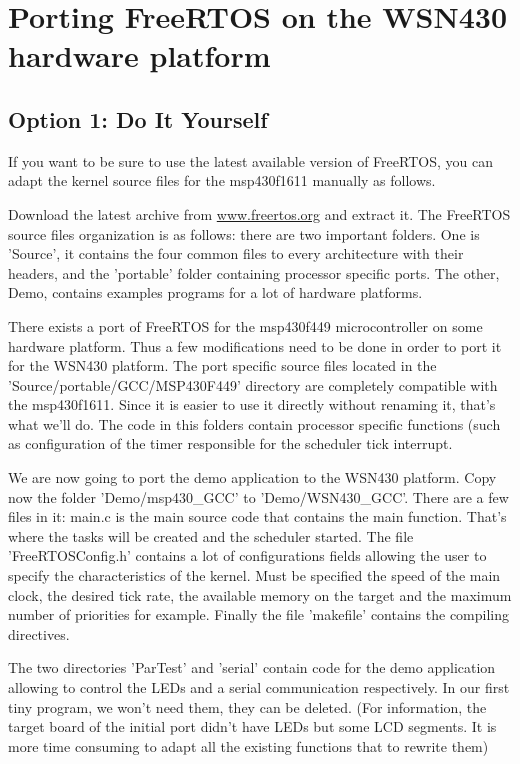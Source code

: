\documentclass[11pt]{report}
\begin{document}
\chapter{Porting FreeRTOS on the WSN430 hardware platform}
\section{Option 1: Do It Yourself}
If you want to be sure to use the latest available version of FreeRTOS, you can adapt the kernel source files for the msp430f1611 manually as follows.

Download the latest archive from \url{www.freertos.org} and extract it. The FreeRTOS source files organization is as follows: there are two important folders. One is 'Source', it contains the four common files to every architecture with their headers, and the 'portable' folder containing processor specific ports. The other, Demo, contains examples programs for a lot of hardware platforms.

There exists a port of FreeRTOS for the msp430f449 microcontroller on some hardware platform. Thus a few modifications need to be done in order to port it for the WSN430 platform. The port specific source files located in  the 'Source/portable/GCC/MSP430F449' directory are completely compatible with the msp430f1611. Since it is easier to use it directly without renaming it, that's what we'll do. The code in this folders contain processor specific functions (such as configuration of the timer responsible for the scheduler tick interrupt.

We are now going to port the demo application to the WSN430 platform. Copy now the folder 'Demo/msp430\_GCC' to 'Demo/WSN430\_GCC'. There are a few files in it: main.c is the main source code that contains the main function. That's where the tasks will be created and the scheduler started. The file 'FreeRTOSConfig.h' contains a lot of configurations fields allowing the user to specify the characteristics of the kernel. Must be specified the speed of the main clock, the desired tick rate, the available memory on the target and the maximum number of priorities for example. Finally the file 'makefile' contains the compiling directives.

The two directories 'ParTest' and 'serial' contain code for the demo application allowing to control the LEDs and a serial communication respectively. In our first tiny program, we won't need them, they can be deleted. (For information, the target board of the initial port didn't have LEDs but some LCD segments. It is more time consuming to adapt all the existing functions that to rewrite them)
\end{document}
